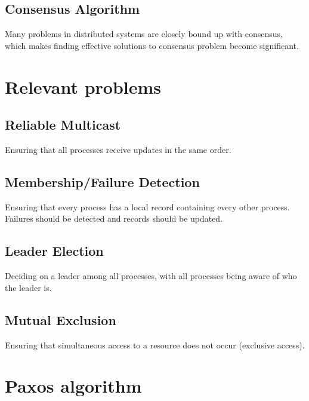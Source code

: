 \documentclass[12pt, a4paper]{article}
\begin{document}
\subsection{Consensus Algorithm}
Many problems in distributed systems are closely bound up with consensus, which makes finding effective solutions to consensus problem become significant. 




\section{Relevant problems}


\subsection{Reliable Multicast}

Ensuring that all processes receive updates in the same order.

\subsection{Membership/Failure Detection}

Ensuring that every process has a local record containing every other process.
Failures should be detected and records should be updated.

\subsection{Leader Election}

Deciding on a leader among all processes, with all processes being aware of
who the leader is.

\subsection{Mutual Exclusion}

Ensuring that simultaneous access to a resource does not occur (exclusive
access).


\section{Paxos algorithm}
\end{document}
